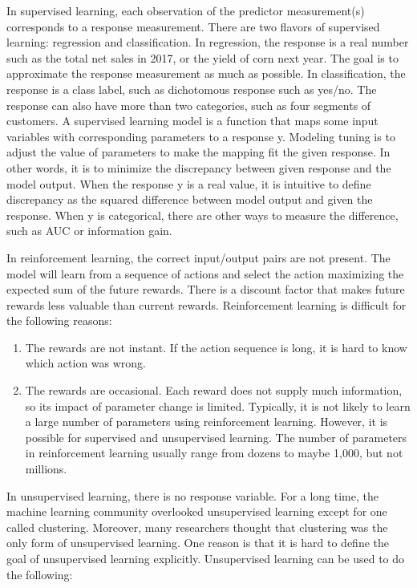 \documentclass[12pt,]{krantz}
\theoremstyle{definition}
\theoremstyle{definition}
\theoremstyle{remark}
\begin{document}
In supervised learning, each observation of the predictor measurement(s)
corresponds to a response measurement. There are two flavors of
supervised learning: regression and classification. In regression, the
response is a real number such as the total net sales in 2017, or the
yield of corn next year. The goal is to approximate the response
measurement as much as possible. In classification, the response is a
class label, such as dichotomous response such as yes/no. The response
can also have more than two categories, such as four segments of
customers. A supervised learning model is a function that maps some
input variables with corresponding parameters to a response y. Modeling
tuning is to adjust the value of parameters to make the mapping fit the
given response. In other words, it is to minimize the discrepancy
between given response and the model output. When the response y is a
real value, it is intuitive to define discrepancy as the squared
difference between model output and given the response. When y is
categorical, there are other ways to measure the difference, such as AUC
or information gain.

In reinforcement learning, the correct input/output pairs are not
present. The model will learn from a sequence of actions and select the
action maximizing the expected sum of the future rewards. There is a
discount factor that makes future rewards less valuable than current
rewards. Reinforcement learning is difficult for the following reasons:

\begin{enumerate}
\def\labelenumi{(\arabic{enumi})}
\item
  The rewards are not instant. If the action sequence is long, it is
  hard to know which action was wrong.
\item
  The rewards are occasional. Each reward does not supply much
  information, so its impact of parameter change is limited. Typically,
  it is not likely to learn a large number of parameters using
  reinforcement learning. However, it is possible for supervised and
  unsupervised learning. The number of parameters in reinforcement
  learning usually range from dozens to maybe 1,000, but not millions.
\end{enumerate}

In unsupervised learning, there is no response variable. For a long
time, the machine learning community overlooked unsupervised learning
except for one called clustering. Moreover, many researchers thought
that clustering was the only form of unsupervised learning. One reason
is that it is hard to define the goal of unsupervised learning
explicitly. Unsupervised learning can be used to do the following:
\end{document}
